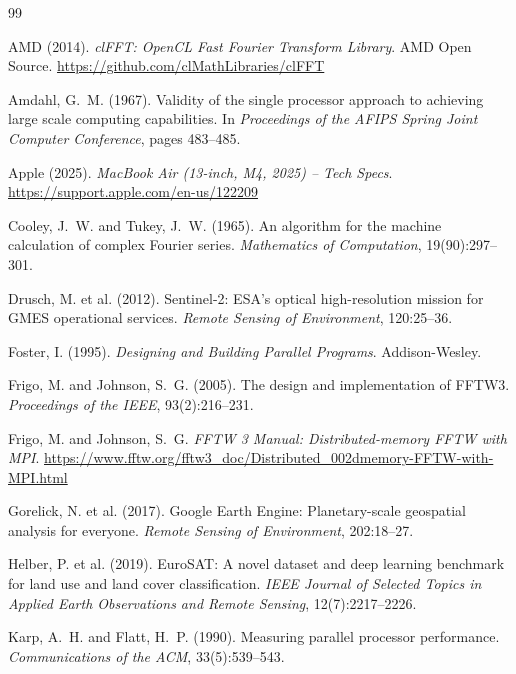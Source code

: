 \documentclass[a4paper,12pt]{report}
\begin{document}
\renewcommand{\bibname}{References}
\begin{singlespace}
\begin{thebibliography}{99}
\setlength{\itemsep}{0pt}

AMD (2014).
\textit{clFFT: OpenCL Fast Fourier Transform Library}.
AMD Open Source. \url{https://github.com/clMathLibraries/clFFT}

Amdahl, G.~M. (1967).
Validity of the single processor approach to achieving large scale
computing capabilities.
In \textit{Proceedings of the AFIPS Spring Joint Computer Conference},
pages 483--485.

Apple (2025). \textit{MacBook Air (13-inch, M4, 2025) -- Tech Specs}.
\url{https://support.apple.com/en-us/122209}

Cooley, J.~W. and Tukey, J.~W. (1965).
An algorithm for the machine calculation of complex Fourier series.
\textit{Mathematics of Computation}, 19(90):297--301.

Drusch, M. et al. (2012).
Sentinel-2: ESA's optical high-resolution mission for GMES operational
services.
\textit{Remote Sensing of Environment}, 120:25--36.

Foster, I. (1995). \textit{Designing and Building Parallel Programs}.
Addison-Wesley.

Frigo, M. and Johnson, S.~G. (2005).
The design and implementation of FFTW3.
\textit{Proceedings of the IEEE}, 93(2):216--231.

Frigo, M. and Johnson, S.~G. \textit{FFTW 3 Manual: Distributed-memory FFTW
with MPI}. \url{https://www.fftw.org/fftw3_doc/Distributed_002dmemory-FFTW-with-MPI.html}

Gorelick, N. et al. (2017).
Google Earth Engine: Planetary-scale geospatial analysis for everyone.
\textit{Remote Sensing of Environment}, 202:18--27.

Helber, P. et al. (2019).
EuroSAT: A novel dataset and deep learning benchmark for land use
and land cover classification.
\textit{IEEE Journal of Selected Topics in Applied Earth Observations
and Remote Sensing}, 12(7):2217--2226.

Karp, A.~H. and Flatt, H.~P. (1990).
Measuring parallel processor performance.
\textit{Communications of the ACM}, 33(5):539--543.


\end{thebibliography}
\end{singlespace}
\end{document}
